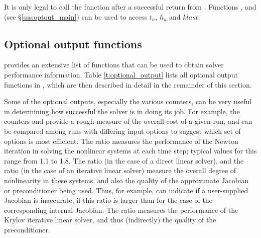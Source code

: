 {{}
{
  It is only legal to call the function  after a 
  successful return from . Functions ,
   and  (see \S\ref{sss:optout_main})
  can be used to access $t_n$, $h_u$ and $klast$.
}


\subsection{Optional output functions}\label{ss:optional_output}

{\ida} provides an extensive list of functions that can be used to obtain
solver performance information.  Table \ref{t:optional_output} lists all optional
output functions in {\ida}, which are then described in detail in the remainder
of this section.

Some of the optional outputs, especially the various counters, can be
very useful in determining how successful the {\ida} solver is in
doing its job.  For example, the counters  and 
provide a rough measure of the overall cost of a given run, and can be
compared among runs with differing input options to suggest which set
of options is most efficient.  The ratio  measures
the performance of the Newton iteration in solving the nonlinear
systems at each time step; typical values for this range from 1.1 to
1.8.  The ratio  (in the case of a direct linear
solver), and the ratio  (in the case of an
iterative linear solver) measure the overall degree of nonlinearity
in these systems, and also the quality of the approximate Jacobian or
preconditioner being used.  Thus, for example, 
can indicate if a user-supplied Jacobian is inaccurate, if this ratio
is larger than for the case of the corresponding internal Jacobian.
The ratio  measures the performance of the Krylov
iterative linear solver, and thus (indirectly) the quality of the
preconditioner.

\vspace*{.2in}

\newlength{\colAA}
\settowidth{\colAA}{No. of residual calls for finite diff. Jacobian-vector evals.}
\newlength{\colBB}

}
